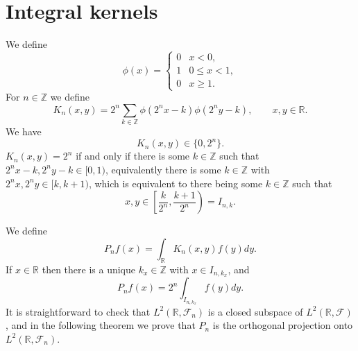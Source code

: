 \documentclass{article}
\theoremstyle{definition}
\theoremstyle{definition}
\begin{document}
\section{Integral kernels}
We define
\[
\phi(x)= \begin{cases}
0&x<0,\\
1&0 \leq x < 1,\\
0&x \geq 1.
\end{cases}
\] 
For $n \in \mathbb{Z}$ we define
\[
K_n(x,y) = 2^n \sum_{k \in \mathbb{Z}} \phi(2^nx-k)\phi(2^n y-k), \qquad x, y \in \mathbb{R}.
\]
We have
\[
K_n(x,y) \in \{0,2^n\}.
\]
$K_n(x,y)=2^n$ if and only if there is some $k \in \mathbb{Z}$ such that $2^n x-k, 2^ny-k \in [0,1)$, equivalently
 there is some $k \in \mathbb{Z}$ with $2^nx,2^ny \in [k,k+1)$, which is equivalent to there being some
$k \in \mathbb{Z}$ such that
\[
x,y \in \left[\frac{k}{2^n},\frac{k+1}{2^n}\right)=I_{n,k}.
\] 

We define
\[
P_n f(x)= \int_{\mathbb{R}} K_n(x,y) f(y) dy.
\]
If $x \in \mathbb{R}$ then there is a unique $k_x \in \mathbb{Z}$ with $x \in I_{n,k_x}$, and 
\begin{equation}
P_n f(x)=2^n \int_{I_{n,k_x}}  f(y)dy.
\label{boxprojection}
\end{equation}
It is straightforward to check
that $L^2(\mathbb{R},\mathscr{F}_n)$ is a closed subspace of $L^2(\mathbb{R},\mathscr{F})$, and in the following theorem
we prove that $P_n$ is the orthogonal projection onto $L^2(\mathbb{R},\mathscr{F}_n)$.
\end{document}
